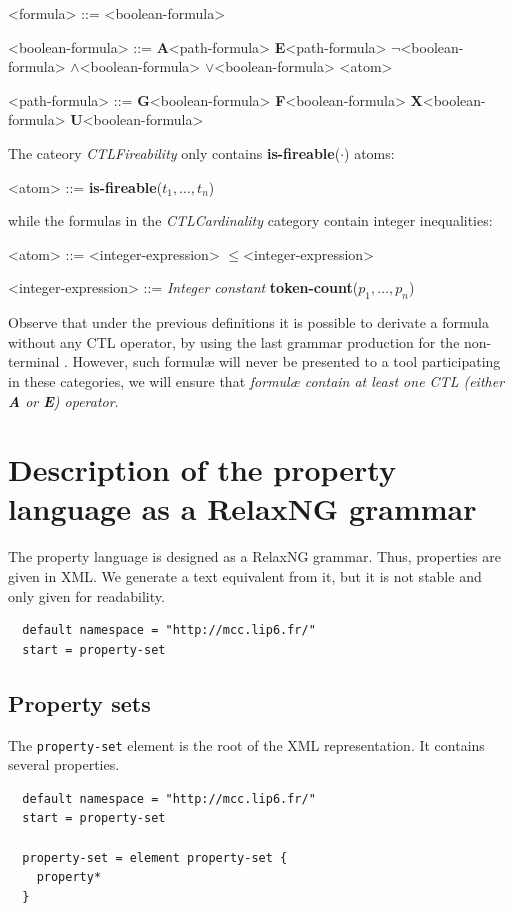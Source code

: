 \documentclass[10pt,english,a4paper]{article}
\newcommand\ctla             {\textbf{A}\xspace}
\newcommand\ctle             {\textbf{E}\xspace}
\newcommand\ltlf             {\textbf{F}\xspace}
\newcommand\ltlg             {\textbf{G}\xspace}
\newcommand\ltlx             {\textbf{X}\xspace}
\newcommand\ltlu             {\textbf{U}\xspace}
\newcommand\logicnot         {\boldmath$\lnot$\xspace}
\newcommand\logicand         {\boldmath$\land$\xspace}
\newcommand\logicor          {\boldmath$\lor$\xspace}
\newcommand\atomleq          {\boldmath$\leq$\xspace}
\newcommand\atomisfire[1]    {\textbf{is-fireable}(#1)}
\newcommand\atomtokenscnt[1] {\textbf{token-count}(#1)}
\begin{document}
\begin{grammar}
<formula> ::= <boolean-formula>

<boolean-formula> ::=
     \ctla <path-formula>
\alt \ctle <path-formula>
\alt \logicnot <boolean-formula>
 \logicand <boolean-formula>
 \logicor <boolean-formula>
\alt <atom>

<path-formula> ::=
     \ltlg <boolean-formula>
\alt \ltlf <boolean-formula>
\alt \ltlx <boolean-formula>
 \ltlu <boolean-formula>
\end{grammar}

The cateory \emph{CTLFireability} only contains \atomisfire{$\cdot$} atoms:

\begin{grammar}
<atom> ::= \atomisfire{$t_1, \ldots, t_n$}
\end{grammar}

while the formulas in the \emph{CTLCardinality} category contain
integer inequalities:

\begin{grammar}
<atom> ::= <integer-expression> \atomleq <integer-expression>

<integer-expression> ::= \textit{Integer constant}
\alt \atomtokenscnt{$p_1, \ldots, p_n$}
\end{grammar}

Observe that under the previous definitions it is possible to derivate a
formula without any CTL operator, by using the last grammar production for
the non-terminal .
However, such formul{\ae} will never be presented to a tool participating
in these categories, we will ensure that
\emph{formul{\ae} contain at least one CTL (either \ctla or \ctle)
operator}.

\section{Description of the property language as a RelaxNG grammar}
The property language is designed as a RelaxNG grammar. Thus, properties are given in XML.
We generate a text equivalent from it, but it is not stable and only given for readability.

\begin{lstlisting}
  default namespace = "http://mcc.lip6.fr/"
  start = property-set
\end{lstlisting}
\subsection{Property sets}
The \lstinline[language=xsd]!property-set! element is the root of the XML representation.
It contains several properties.
\begin{lstlisting}
  default namespace = "http://mcc.lip6.fr/"
  start = property-set

  property-set = element property-set {
    property*
  }
\end{lstlisting}
\end{document}
